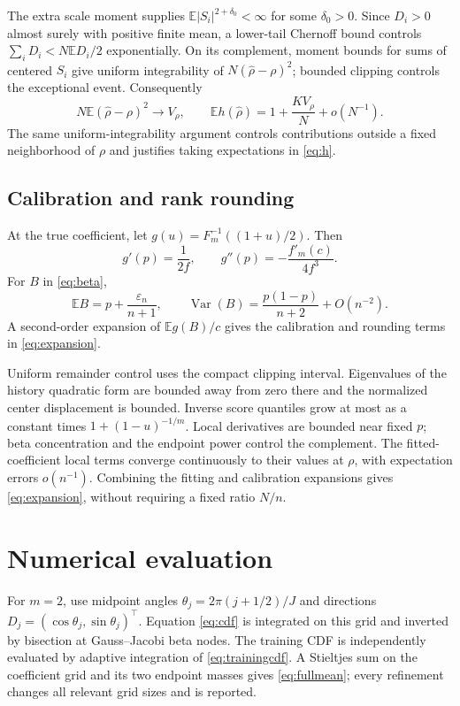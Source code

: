 \documentclass[nolineno]{ieeeaccess}
\newcommand{\E}{\mathbb{E}}
\newcommand{\Var}{\operatorname{Var}}
\begin{document}
The extra scale moment supplies $\E|S_i|^{2+\delta_0}<\infty$ for some $\delta_0>0$. Since $D_i>0$ almost surely with positive finite mean, a lower-tail Chernoff bound controls $\sum_iD_i<N\E D_i/2$ exponentially. On its complement, moment bounds for sums of centered $S_i$ give uniform integrability of $N(\widehat\rho-\rho)^2$; bounded clipping controls the exceptional event. Consequently
\begin{equation}
N\E(\widehat\rho-\rho)^2\to V_\rho,\qquad
\E h(\widehat\rho)=1+\frac{KV_\rho}{N}+o(N^{-1}).
\end{equation}
The same uniform-integrability argument controls contributions outside a fixed neighborhood of $\rho$ and justifies taking expectations in \eqref{eq:h}.

\subsection{Calibration and rank rounding}
At the true coefficient, let $g(u)=F_m^{-1}((1+u)/2)$. Then
\begin{equation}
g'(p)=\frac1{2f},\qquad g''(p)=-\frac{f'_m(c)}{4f^3}.
\end{equation}
For $B$ in \eqref{eq:beta},
\begin{equation}
\E B=p+\frac{\varepsilon_n}{n+1},\qquad
\Var(B)=\frac{p(1-p)}{n+2}+O(n^{-2}).
\end{equation}
A second-order expansion of $\E g(B)/c$ gives the calibration and rounding terms in \eqref{eq:expansion}.

Uniform remainder control uses the compact clipping interval. Eigenvalues of the history quadratic form are bounded away from zero there and the normalized center displacement is bounded. Inverse score quantiles grow at most as a constant times $1+(1-u)^{-1/m}$. Local derivatives are bounded near fixed $p$; beta concentration and the endpoint power control the complement. The fitted-coefficient local terms converge continuously to their values at $\rho$, with expectation errors $o(n^{-1})$. Combining the fitting and calibration expansions gives \eqref{eq:expansion}, without requiring a fixed ratio $N/n$.

\section{Numerical evaluation}
For $m=2$, use midpoint angles $\theta_j=2\pi(j+1/2)/J$ and directions $D_j=(\cos\theta_j,\sin\theta_j)^\top$. Equation \eqref{eq:cdf} is integrated on this grid and inverted by bisection at Gauss--Jacobi beta nodes. The training CDF is independently evaluated by adaptive integration of \eqref{eq:trainingcdf}. A Stieltjes sum on the coefficient grid and its two endpoint masses gives \eqref{eq:fullmean}; every refinement changes all relevant grid sizes and is reported.
\end{document}
